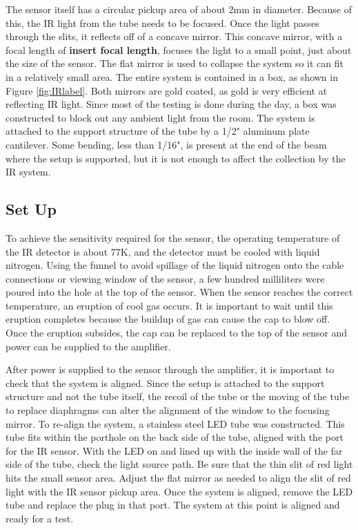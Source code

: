 The sensor itself has a circular pickup area of about 2mm in diameter. Because of this, the IR light from the tube needs to be focused. Once the light passes through the slits, it reflects off of a concave mirror. This concave mirror, with a focal length of \textbf{insert focal length}, focuses the light to a small point, just about the size of the sensor. The flat mirror is used to collapse the system so it can fit in a relatively small area. The entire system is contained in a box, as shown in Figure \ref{fig:IRlabel}. Both mirrors are gold coated, as gold is very efficient at reflecting IR light. Since most of the testing is done during the day, a box was constructed to block out any ambient light from the room. The system is attached to the support structure of the tube by a 1/2" aluminum plate cantilever. Some bending, less than 1/16",  is present at the end of the beam where the setup is supported, but it is not enough to affect the collection by the IR system. 


\subsection{Set Up}


To achieve the sensitivity required for the sensor, the operating temperature of the IR detector is about 77K, and the detector must be cooled with liquid nitrogen. Using the funnel to avoid spillage of the liquid nitrogen onto the cable connections or viewing window of the sensor, a few hundred milliliters were poured into the hole at the top of the sensor. When the sensor reaches the correct temperature, an eruption of cool gas occurs. It is important to wait until this eruption completes because the buildup of gas can cause the cap to blow off. Once the eruption subsides, the cap can be replaced to the top of the sensor and power can be supplied to the amplifier. 

After power is supplied to the sensor through the amplifier, it is important to check that the system is aligned. Since the setup is attached to the support structure and not the tube itself, the recoil of the tube or the moving of the tube to replace diaphragms can alter the alignment of the window to the focusing mirror. To re-align the system, a stainless steel LED tube was constructed. This tube fits within the porthole on the back side of the tube, aligned with the port for the IR sensor. With the LED on and lined up with the inside wall of the far side of the tube, check the light source path. Be sure that the thin slit of red light hits the small sensor area. Adjust the flat mirror as needed to align the slit of red light with the IR sensor pickup area. Once the system is aligned, remove the LED tube and replace the plug in that port. The system at this point is aligned and ready for a test.  

